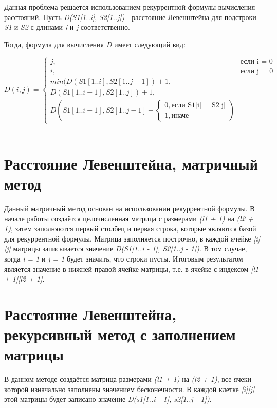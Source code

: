 \documentclass[12pt,a4paper]{report}
\begin{document}
Данная проблема решается использованием рекуррентной формулы вычисления расстояний. Пусть \textit{D(S1[1..i]}, 
\textit{S2[1..j])} - расстояние Левенштейна для подстроки \textit{S1} и \textit{S2} с длинами \textit{i} и \textit{j} соответственно.\

Тогда, формула для вычисления \textit{D} имеет следующий вид:

\begin{displaymath}
	D(i,j) = \left\{ 
	\begin{array}{ll}
		j, & \textrm{если i = 0} \\
		i, & \textrm{если j = 0} \\
		min(D(S1[1..i], S2[1..j-1]) + 1,\\
		D(S1[1..i-1], S2[1..j]) + 1,\\
		D(S1[1..i-1], S2[1..j-1] + \left \{ 
		\begin{array}{ll}
			0, \textrm{если S1[i] = S2[j]} \\ 
			1, \textrm{иначе}
		\end{array} \right.
		)
	\end{array} \right.
\end{displaymath} \\

\section{Расстояние Левенштейна, матричный метод}

Данный матричный метод основан на использовании рекуррентной формулы. В начале работы создаётся 
целочисленная матрица с размерами \textit{(l1 + 1)} на \textit{(l2 + 1)}, затем заполняются первый столбец и первая 
строка, которые являются базой для рекуррентной формулы. Матрица заполняется построчно, в каждой 
ячейке \textit{[i][j]} матрицы записывается значение \textit{D(S1[1..i - 1], S2[1..j - 1])}. В том случае, когда \textit{i = 1} и 
\textit{j = 1} будет значить, что строки пусты. Итоговым результатом является значение в нижней правой ячейке
матрицы, т.е. в ячейке с индексом \textit{[l1 + 1][l2 + 1]}. 

\section{Расстояние Левенштейна, рекурсивный метод с заполнением матрицы}

В данном методе создаётся матрица размерами \textit{(l1 + 1)} на \textit{(l2 + 1)}, все ячеки которой изначально заполнены 
значением бесконечности. В каждой клетке \textit{[i][j]} этой матрицы будет записано значение \textit{D(s1[1..i - 1], s2[1..j - 1])}.
\end{document}
